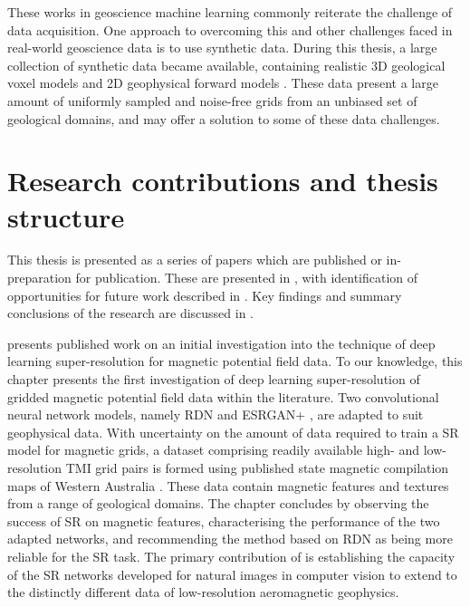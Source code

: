 These works in geoscience machine learning commonly reiterate the challenge of data acquisition.
One approach to overcoming this and other challenges faced in real-world geoscience data is to use synthetic data.
During this thesis, a large collection of synthetic data became available, containing realistic 3D geological voxel models and 2D geophysical forward models \parencite{jessellNoddyverseMassiveData2022}.
These data present a large amount of uniformly sampled and noise-free grids from an unbiased set of geological domains, and may offer a solution to some of these data challenges.

\section{Research contributions and thesis structure}
This thesis is presented as a series of papers which are published or in-preparation for publication.
These are presented in , with identification of opportunities for future work described in .
Key findings and summary conclusions of the research are discussed in .

 presents published work on an initial investigation into the technique of deep learning super-resolution for magnetic potential field data.
To our knowledge, this chapter presents the first investigation of deep learning super-resolution of gridded magnetic potential field data within the literature.
Two convolutional neural network models, namely RDN and ESRGAN+ \parencite{zhangResidualDenseNetwork2018,limEnhancedDeepResidual2017}, are adapted to suit geophysical data.
With uncertainty on the amount of data required to train a SR model for magnetic grids, a dataset comprising readily available high- and low-resolution TMI grid pairs is formed using published state magnetic compilation maps of Western Australia \parencite{brett20MagneticMerged2020}.
These data contain magnetic features and textures from a range of geological domains.
The chapter concludes by observing the success of SR on magnetic features, characterising the performance of the two adapted networks, and recommending the method based on RDN as being more reliable for the SR task.
The primary contribution of  is establishing the capacity of the SR networks developed for natural images in computer vision to extend to the distinctly different data of low-resolution aeromagnetic geophysics.

